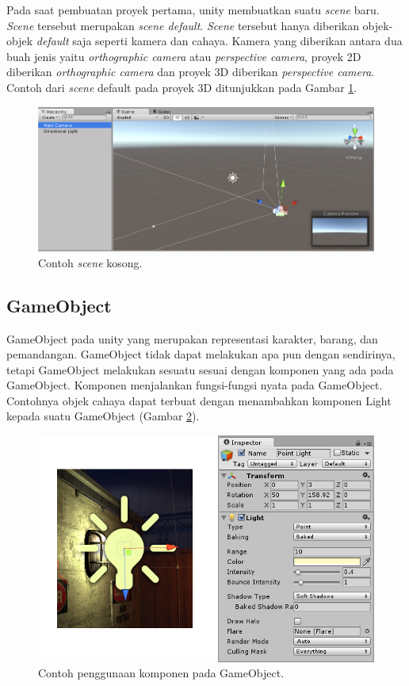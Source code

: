 Pada saat pembuatan proyek pertama, unity membuatkan suatu \textit{scene} baru. \textit{Scene} tersebut merupakan \textit{scene default}. \textit{Scene} tersebut hanya diberikan objek-objek \textit{default} saja seperti kamera dan cahaya. Kamera yang diberikan antara dua buah jenis yaitu \textit{orthographic camera} atau \textit{perspective camera}, proyek 2D diberikan \textit{orthographic camera} dan proyek 3D diberikan \textit{perspective camera}. Contoh dari \textit{scene} default pada proyek 3D ditunjukkan pada Gambar \ref{fig:contoh-scene-kosong}.
 
\begin{figure}[htbp]
\centering
\includegraphics[scale=0.5]{Gambar/new-empty-scene.png}
\caption{Contoh \textit{scene} kosong.} 
\label{fig:contoh-scene-kosong}
\end{figure}


\subsection{GameObject}
\label{ssec:gameobject}
GameObject pada unity yang merupakan representasi karakter, barang, dan pemandangan. GameObject tidak dapat melakukan apa pun dengan sendirinya, tetapi GameObject melakukan sesuatu sesuai dengan komponen yang ada pada GameObject. Komponen menjalankan fungsi-fungsi nyata pada GameObject. Contohnya objek cahaya dapat terbuat dengan menambahkan komponen Light kepada suatu GameObject (Gambar \ref{fig:contoh-component-pada-game-object}).

\begin{figure}[htbp]
\centering
\includegraphics[scale=0.7]{Gambar/contoh-component-pada-game-object.png}
\caption{Contoh penggunaan komponen pada GameObject.} 
\label{fig:contoh-component-pada-game-object}
\end{figure}
 
